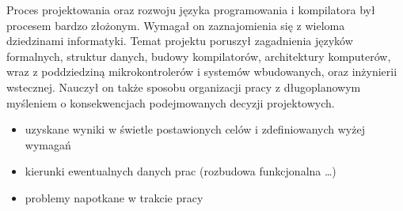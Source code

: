 Proces projektowania oraz rozwoju języka programowania i kompilatora był procesem bardzo złożonym. Wymagał on zaznajomienia się z wieloma dziedzinami informatyki. Temat projektu poruszył zagadnienia języków formalnych, struktur danych, budowy kompilatorów, architektury komputerów, wraz z poddziedziną mikrokontrolerów i systemów wbudowanych, oraz inżynierii wstecznej. Nauczył on także sposobu organizacji pracy z długoplanowym myśleniem o konsekwencjach podejmowanych decyzji projektowych.




\begin{itemize}
\item uzyskane wyniki w świetle postawionych celów i zdefiniowanych wyżej wymagań
\item kierunki ewentualnych danych prac (rozbudowa funkcjonalna …)
\item problemy napotkane w trakcie pracy
\end{itemize}

